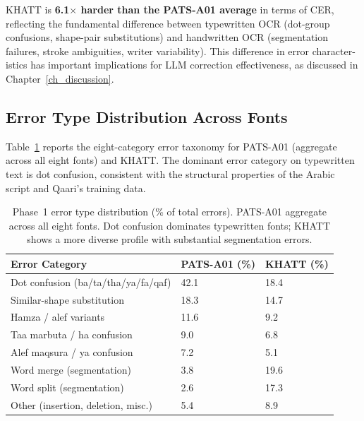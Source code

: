 KHATT is \textbf{6.1$\times$ harder than the PATS-A01 average} in terms
of CER, reflecting the fundamental difference between typewritten OCR
(dot-group confusions, shape-pair substitutions) and handwritten OCR
(segmentation failures, stroke ambiguities, writer variability). This
difference in error character-istics has important implications for
LLM correction effectiveness, as discussed in Chapter~\ref{ch_discussion}.

\subsection{Error Type Distribution Across Fonts}
\label{subsec:res_p1_taxonomy}

Table~\ref{tab:p1_taxonomy} reports the eight-category error taxonomy for
PATS-A01 (aggregate across all eight fonts) and KHATT. The dominant error
category on typewritten text is dot confusion, consistent with the structural
properties of the Arabic script and Qaari's training data.

\begin{table}[htbp]
  \centering
  \caption{Phase~1 error type distribution (\% of total errors).
           PATS-A01 aggregate across all eight fonts. Dot confusion
           dominates typewritten fonts; KHATT shows a more diverse profile
           with substantial segmentation errors.}
  \label{tab:p1_taxonomy}
  \begin{tabularx}{\textwidth}{lXX}
    \toprule
    \textbf{Error Category} & \textbf{PATS-A01 (\%)} & \textbf{KHATT (\%)} \\
    \midrule
    Dot confusion (ba/ta/tha/ya/fa/qaf)   & 42.1 & 18.4 \\
    Similar-shape substitution            & 18.3 & 14.7 \\
    Hamza / alef variants                 & 11.6 &  9.2 \\
    Taa marbuta / ha confusion            &  9.0 &  6.8 \\
    Alef maqsura / ya confusion           &  7.2 &  5.1 \\
    Word merge (segmentation)             &  3.8 & 19.6 \\
    Word split (segmentation)             &  2.6 & 17.3 \\
    Other (insertion, deletion, misc.)    &  5.4 &  8.9 \\
    \bottomrule
  \end{tabularx}
\end{table}

